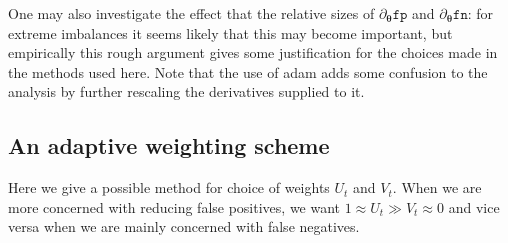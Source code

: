 \documentclass[10pt,a4paper]{article}
\begin{document}
One may also investigate the effect that the relative sizes of $\partial_{\boldsymbol\theta}\texttt{fp}$ and $\partial_{\boldsymbol\theta}\texttt{fn}$: for extreme imbalances it seems likely that this may become important, but empirically this rough argument gives some justification for the choices made in the methods used here.
Note that the use of adam adds some confusion to the analysis by further rescaling the derivatives supplied to it.
\subsection{An adaptive weighting scheme}
Here we give a possible method for choice of weights $U_t$ and $V_t$.
When we are more concerned with reducing false positives, we want $1\approx U_t\gg V_t\approx0$ and vice versa when we are mainly concerned with false negatives.



\end{document}

